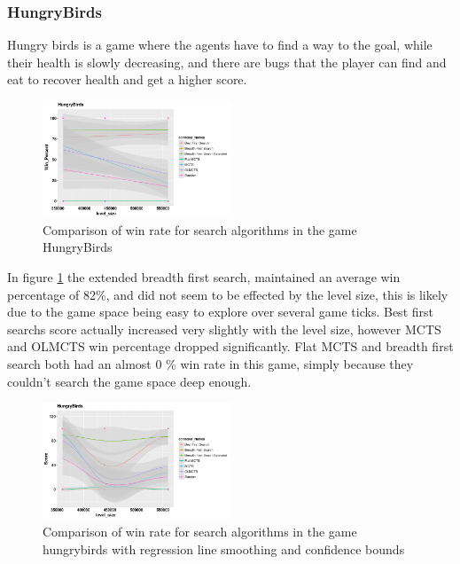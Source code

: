 \documentclass[journal]{IEEEtran}
\begin{document}
		\subsubsection{HungryBirds}
		Hungry birds is a game where the agents have to find a way to the goal, while their health is slowly decreasing, and there are bugs that the player can find and eat to recover health and get a higher score.
		\begin{figure}[h]
		    \centering
		    \includegraphics[width=0.5\textwidth]{Scatter/game_4_win_confidence}
		    \caption{ Comparison of win rate for search algorithms in the game HungryBirds }
		    \label{fig:game_4_win_confidence}
		\end{figure}
		In figure \ref{fig:game_4_win_confidence} the extended breadth first search, maintained an average win percentage of 82\%, and did not seem to be effected by the level size, this is likely due to the game space being easy to explore over several game ticks.
		Best first searchs score actually increased very slightly with the level size, however MCTS and OLMCTS win percentage dropped significantly.
		Flat MCTS and breadth first search both had an almost 0 \% win rate in this game, simply because they couldn't search the game space deep enough.

		\begin{figure}[h]
		    \centering
		    \includegraphics[width=0.5\textwidth]{Scatter/game_4_Score_smoothing_confidence}
		    \caption{ Comparison of win rate for search algorithms in the game hungrybirds with regression line smoothing and confidence bounds}
		    \label{fig:game_4_score_confidence}
		\end{figure}
\end{document}
